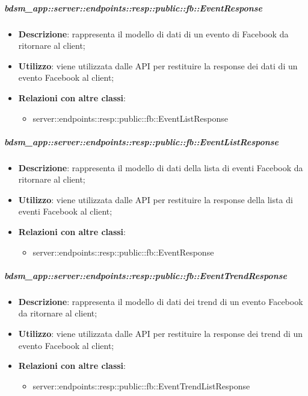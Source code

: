     \subparagraph{bdsm\_app::server::endpoints::resp::public::fb::EventResponse} %
    \label{subp:bdsm_app_server_endpoints_resp_public_fb_eventresponse}
    \begin{itemize}
      \item \textbf{Descrizione}: rappresenta il modello di dati di un evento di Facebook da ritornare al client;
      \item \textbf{Utilizzo}: viene utilizzata dalle API per restituire la response dei dati di un evento Facebook al client;
      \item \textbf{Relazioni con altre classi}:
        \begin{itemize}
          \item server::endpoints::resp::public::fb::EventListResponse
        \end{itemize}
      \end{itemize}
    
    \subparagraph{bdsm\_app::server::endpoints::resp::public::fb::EventListResponse} %
    \label{subp:bdsm_app_server_endpoints_resp_public_fb_eventlistresponse}
    \begin{itemize}
      \item \textbf{Descrizione}: rappresenta il modello di dati della lista di eventi Facebook da ritornare al client;
      \item \textbf{Utilizzo}: viene utilizzata dalle API per restituire la response della lista di eventi Facebook al client;
      \item \textbf{Relazioni con altre classi}:
        \begin{itemize}
          \item server::endpoints::resp::public::fb::EventResponse
        \end{itemize}
      \end{itemize}
    
    \subparagraph{bdsm\_app::server::endpoints::resp::public::fb::EventTrendResponse} %
    \label{subp:bdsm_app_server_endpoints_resp_public_fb_eventtrendresponse}
    \begin{itemize}
      \item \textbf{Descrizione}: rappresenta il modello di dati dei trend di un evento Facebook da ritornare al client;
      \item \textbf{Utilizzo}: viene utilizzata dalle API per restituire la response dei trend di un evento Facebook al client;
      \item \textbf{Relazioni con altre classi}:
        \begin{itemize}
          \item server::endpoints::resp::public::fb::EventTrendListResponse
        \end{itemize}
      \end{itemize}
    
